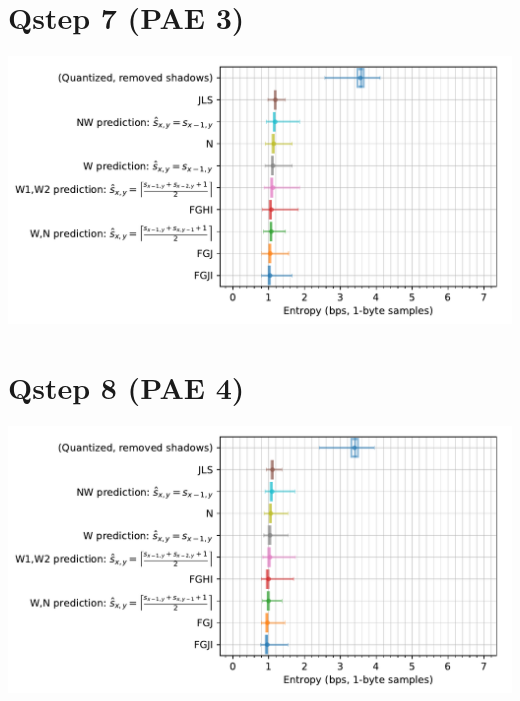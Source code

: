 \documentclass{class/technicalReportUAB}
\begin{document}
\section{Qstep 7 (PAE 3)}
\includegraphics[width=\linewidth]{./plots_q7/ScalarNumericAnalyzer-entropy_1B_bps-boxplot-groupby__version_name.pdf}

\section{Qstep 8 (PAE 4)}
\includegraphics[width=\linewidth]{./plots_q8/ScalarNumericAnalyzer-entropy_1B_bps-boxplot-groupby__version_name.pdf}



% 
% 
\end{document}
